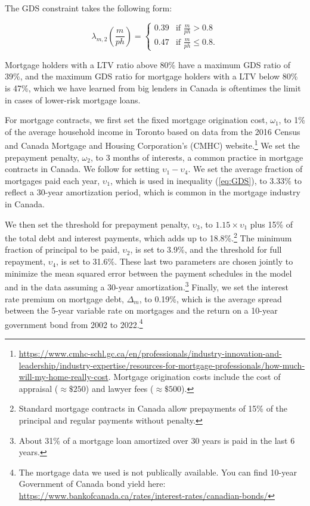 \documentclass[parskip=full]{article}
\begin{document}
The GDS constraint takes the following form:

\begin{equation*}
\lambda_{m,2}\left(\frac{m}{ph}\right) = \begin{cases}
0.39 &\text{if $\frac{m}{ph}>0.8$}\\
0.47 &\text{if $\frac{m}{ph}\leq 0.8$}.
\end{cases}
\end{equation*}

\noindent Mortgage holders with a LTV ratio above 80\% have a maximum GDS ratio of 39\%, and the maximum GDS ratio for mortgage holders with a LTV below 80\% is 47\%, which we have learned from big lenders in Canada is oftentimes the limit in cases of lower-risk mortgage loans. 

For mortgage contracts, we first set the fixed mortgage origination cost, $\omega_{1}$, to 1\% of the average household income in Toronto based on data from the 2016 Census and Canada Mortgage and Housing Corporation's (CMHC) website.\footnote{\url{https://www.cmhc-schl.gc.ca/en/professionals/industry-innovation-and-leadership/industry-expertise/resources-for-mortgage-professionals/how-much-will-my-home-really-cost}. Mortgage origination costs include the cost of appraisal ($\approx\$250$) and lawyer fees ($\approx\$500$).} We set the prepayment penalty, $\omega_{2}$, to 3 months of interests, a common practice in mortgage contracts in Canada. We follow \citet{rs-2023} for setting $\upsilon_{1}-\upsilon_{4}$. We set the average fraction of mortgages paid each year, $\upsilon_{1}$, which is used in inequality (\ref{eq:GDS}), to 3.33\% to reflect a 30-year amortization period, which is common in the mortgage industry in Canada. 

We then set the threshold for prepayment penalty, $\upsilon_{3}$, to $1.15 \times \upsilon_{1}$ plus 15\% of the total debt and interest payments, which adds up to 18.8\%.\footnote{Standard mortgage contracts in Canada allow prepayments of 15\% of the principal and regular payments without penalty.} The minimum fraction of principal to be paid, $\upsilon_{2}$, is set to 3.9\%, and the threshold for full repayment, $\upsilon_{4}$, is set to 31.6\%. These last two parameters are chosen jointly to minimize the mean squared error between the payment schedules in the model and in the data assuming a 30-year amortization.\footnote{About 31\% of a mortgage loan amortized over 30 years is paid in the last 6 years.} Finally, we set the interest rate premium on mortgage debt, $\Delta_{m}$, to 0.19\%, which is the average spread between the 5-year variable rate on mortgages and the return on a 10-year government bond from 2002 to 2022.\footnote{The mortgage data we used is not publically available. You can find 10-year Government of Canada bond yield here: \url{https://www.bankofcanada.ca/rates/interest-rates/canadian-bonds/}}
\end{document}
